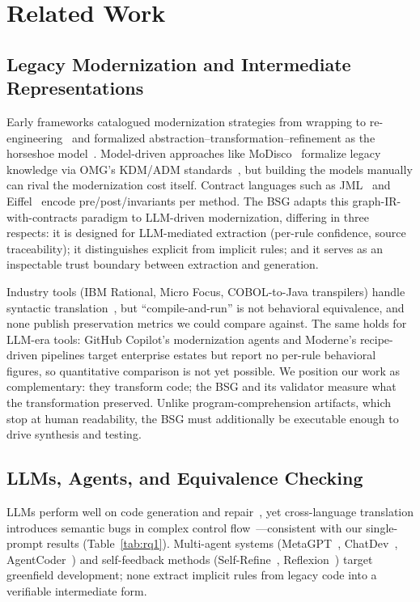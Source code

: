 \documentclass[conference]{IEEEtran}
\begin{document}
\section{Related Work}

\subsection{Legacy Modernization and Intermediate Representations}

Early frameworks catalogued modernization strategies from wrapping to re-engineering~\cite{comella2000survey} and formalized abstraction--transformation--refinement as the horseshoe model~\cite{kazman1998requirements}. Model-driven approaches like MoDisco~\cite{bruneliere2014modisco} formalize legacy knowledge via OMG's KDM/ADM standards~\cite{omg2016kdm}, but building the models manually can rival the modernization cost itself. Contract languages such as JML~\cite{leavens1999jml} and Eiffel~\cite{meyer1992dbc} encode pre/post/invariants per method. The BSG adapts this graph-IR-with-contracts paradigm to LLM-driven modernization, differing in three respects: it is designed for LLM-mediated extraction (per-rule confidence, source traceability); it distinguishes explicit from implicit rules; and it serves as an inspectable trust boundary between extraction and generation.

Industry tools (IBM Rational, Micro Focus, COBOL-to-Java transpilers) handle syntactic translation~\cite{delucia2001cobol}, but ``compile-and-run'' is not behavioral equivalence, and none publish preservation metrics we could compare against. The same holds for LLM-era tools: GitHub Copilot's modernization agents and Moderne's recipe-driven pipelines target enterprise estates but report no per-rule behavioral figures, so quantitative comparison is not yet possible. We position our work as complementary: they transform code; the BSG and its validator measure what the transformation preserved. Unlike program-comprehension artifacts, which stop at human readability, the BSG must additionally be executable enough to drive synthesis and testing.

\subsection{LLMs, Agents, and Equivalence Checking}

LLMs perform well on code generation and repair~\cite{chen2021evaluating}, yet cross-language translation introduces semantic bugs in complex control flow~\cite{pan2024lost}---consistent with our single-prompt results (Table~\ref{tab:rq1}). Multi-agent systems (MetaGPT~\cite{hong2024metagpt}, ChatDev~\cite{qian2024chatdev}, AgentCoder~\cite{huang2023agentcoder}) and self-feedback methods (Self-Refine~\cite{madaan2023selfrefine}, Reflexion~\cite{shinn2023reflexion}) target greenfield development; none extract implicit rules from legacy code into a verifiable intermediate form.
\end{document}
